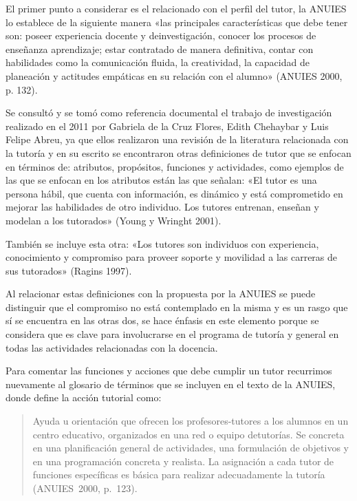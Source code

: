El primer punto a considerar es el relacionado con el perfil del tutor, la
ANUIES lo establece de la siguiente manera «las principales características
que debe tener son: poseer experiencia docente y de\linebreak investigación, conocer
los procesos de enseñanza aprendizaje; estar contratado de manera
definitiva, contar con habilidades como la comunicación fluida, la
creatividad, la capacidad de planeación y actitudes empáticas en su
relación con el alumno» (ANUIES 2000, p. 132).


Se consultó  y se tomó como referencia documental el trabajo de
investigación realizado en el 2011 por Gabriela de la Cruz Flores, Edith
Chehaybar y Luis Felipe Abreu, ya que ellos realizaron una revisión de la
literatura relacionada con la tutoría y en su escrito se encontraron 
otras definiciones de tutor que se enfocan en términos de: atributos,
propósitos, funciones y actividades, como  ejemplos de las que se enfocan
en los atributos están las que señalan: «El tutor es una persona hábil, que
cuenta con información, es dinámico y está comprometido en mejorar las
habilidades de otro individuo. Los tutores entrenan, enseñan y modelan a
los tutorados» (Young y Wringht 2001).


También se incluye esta otra: «Los tutores son individuos con experiencia,
conocimiento y compromiso para proveer soporte y movilidad a las carreras
de sus tutorados» (Ragins 1997).


Al relacionar estas definiciones con la propuesta por la ANUIES se puede
distinguir que el compromiso no está contemplado en la misma y es un rasgo
que sí se encuentra en las otras dos, se hace énfasis en este elemento
porque se considera que es clave para involucrarse en el programa de
tutoría y general en todas las actividades relacionadas con la docencia.

\enlargethispage{1\baselineskip}
Para comentar las funciones y acciones que debe cumplir un tutor recurrimos
nuevamente al glosario de términos que se incluyen en el texto de la ANUIES,
 donde define la acción tutorial como: 

\begin{quotation}
Ayuda u orientación que ofrecen los profesores-tutores a los alumnos en un
centro educativo, organizados en una red o equipo de\linebreak tutorías. Se concreta
en una planificación general de actividades, una formulación de objetivos y
en una programación concreta y realista. La asignación a cada tutor de
funciones específicas es básica para realizar adecuadamente la tutoría
(ANUIES~2000, p.~123).
\end{quotation}


